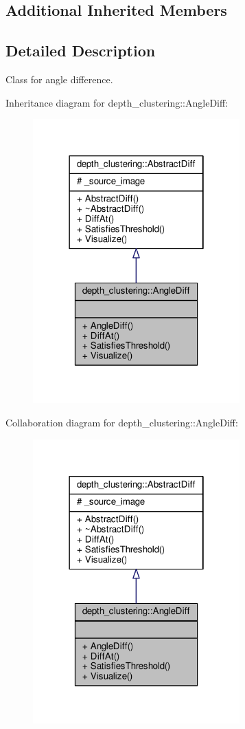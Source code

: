 \subsection*{Additional Inherited Members}


\subsection{Detailed Description}
Class for angle difference. 

Inheritance diagram for depth\-\_\-clustering\-:\-:Angle\-Diff\-:
\nopagebreak
\begin{figure}[H]
\begin{center}
\leavevmode
\includegraphics[width=226pt]{classdepth__clustering_1_1AngleDiff__inherit__graph}
\end{center}
\end{figure}


Collaboration diagram for depth\-\_\-clustering\-:\-:Angle\-Diff\-:
\nopagebreak
\begin{figure}[H]
\begin{center}
\leavevmode
\includegraphics[width=226pt]{classdepth__clustering_1_1AngleDiff__coll__graph}
\end{center}
\end{figure}



